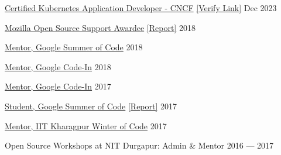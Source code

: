 \href{https://docs.naveenkumarsangi.me/ckad-certificate.pdf}{Certified Kubernetes Application Developer - CNCF} \href{https://www.credly.com/badges/f496c372-5779-49d9-b51a-58aff3c5963b/public_url}{[Verify Link]} \hfill Dec 2023

\href{https://docs.naveenkumarsangi.me/moss.pdf}{Mozilla Open Source Support Awardee} \href{https://docs.naveenkumarsangi.me/moss-report.pdf}{[Report]} \hfill 2018

\href{https://docs.naveenkumarsangi.me/gsoc-mentor.pdf}{Mentor, Google Summer of Code} \hfill 2018

\href{https://docs.naveenkumarsangi.me/gci-mentor-2018.pdf}{Mentor, Google Code-In} \hfill 2018

\href{https://docs.naveenkumarsangi.me/gci-mentor-2017.pdf}{Mentor, Google Code-In} \hfill 2017

\href{https://docs.naveenkumarsangi.me/gsoc-mentee.pdf}{Student, Google Summer of Code} \href{https://summerofcode.withgoogle.com/archive/2017/projects/4690491102724096}{[Report]} \hfill 2017

\href{https://docs.naveenkumarsangi.me/kwoc.jpg}{Mentor, IIT Kharagpur Winter of Code} \hfill 2017

Open Source Workshops at NIT Durgapur: Admin \& Mentor \hfill 2016 --- 2017